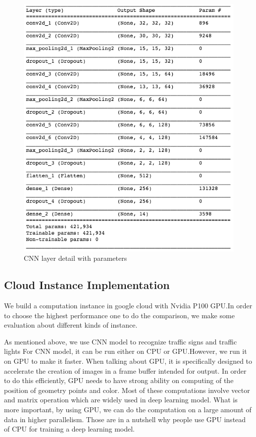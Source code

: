 \documentclass[conference]{IEEEtran}
\begin{document}
\begin{figure}[hb]
\centering
  \begin{minipage}{.4\textwidth}
    \centering
    \includegraphics[width=0.8\linewidth]{archi_param.png}
    \caption{CNN layer detail with parameters}
    \label{fig:fig_1}
  \end{minipage}
\end{figure}


\subsection{Cloud Instance Implementation}

We build a computation instance in google cloud with Nvidia P100 GPU.In order to choose the highest performance one to do the comparison, we make some evaluation about different kinds of instance. 

As mentioned above, we use CNN model to recognize traffic signs and traffic lights For CNN model, it can be run either on CPU or GPU.However, we run it on GPU to make it faster. When talking about GPU, it is specifically designed to accelerate the creation of images in a frame buffer intended for output. In order to do this efficiently, GPU needs to have strong ability on computing of the position of geometry points and color. Most of these computations involve vector and matrix operation which are widely used in deep learning model. What is more important, by using GPU, we can do the computation on a large amount of data in higher parallelism. Those are in a nutshell why people use GPU instead of CPU for training a deep learning model. 
\end{document}
